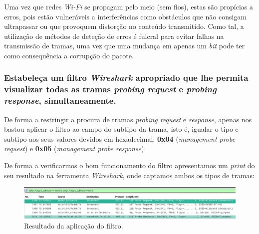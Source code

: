     \vspace{5pt}
    \par Uma vez que redes \textit{Wi-Fi} se propagam pelo meio (sem fios), estas são propícias a erros, pois estão vulneráveis a interferências como obstáculos que não consigam ultrapassar ou que provoquem distorção no conteúdo transmitido. Como tal, a utilização de métodos de deteção de erros é fulcral para evitar falhas na transmissão de tramas, uma vez que uma mudança em apenas um \textit{bit} pode ter como consequência a corrupção do pacote. 
    
    





\newpage
\subsubsection{Estabeleça um filtro \textit{Wireshark} apropriado que lhe permita visualizar todas as tramas \textit{probing request} e \textit{probing response}, simultaneamente.}

    \par De forma a restringir a procura de tramas \textit{probing request} e \textit{response}, apenas nos bastou aplicar o filtro ao campo do subtipo da trama, isto é, igualar o tipo e subtipo aos seus valores devidos em hexadecimal: \textbf{0x04} (\textit{management probe request}) e \textbf{0x05} (\textit{management probe response}).

    \vspace{10pt}
    \begin{minipage}{\linewidth}
        \centering
    \end{minipage}

    \vspace{10pt}
    \par De forma a verificarmos o bom funcionamento do filtro apresentamos um \textit{print} do seu resultado na ferramenta \textit{Wireshark}, onde captamos ambos os tipos de tramas:
    
    \begin{figure}[H]
    \centering
    \includegraphics[width=\linewidth]{Prints/Questao5/questao5-ReqRespnse.png}
    \caption{Resultado da aplicação do filtro.} \label{questao5-ReqResponse}
    \end{figure}
    




